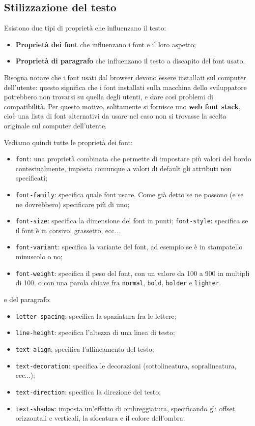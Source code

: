 \documentclass[a4paper,11pt]{article}
\begin{document}
\subsection{Stilizzazione del testo}
Esistono due tipi di proprietà che influenzano il testo:
\begin{itemize}
	\item \textbf{Proprietà dei font} che influenzano i font e il loro aspetto;
	\item \textbf{Proprietà di paragrafo} che influenzano il testo a discapito del font usato.
\end{itemize}

Bisogna notare che i font usati dal browser devono essere installati sul computer dell'utente: questo significa che i font installati sulla macchina dello sviluppatore potrebbero non trovarsi su quella degli utenti, e dare così problemi di compatibilità.
Per questo motivo, solitamente si fornisce uno \textbf{web font stack}, cioè una lista di font alternativi da usare nel caso non si trovasse la scelta originale sul computer dell'utente.

Vediamo quindi tutte le proprietà dei font:
\begin{itemize}
	\item \lstinline|font|: una proprietà combinata che permette di impostare più valori del bordo contestualmente, imposta comunque a valori di default gli attributi non specificati;
	\item \lstinline|font-family|: specifica quale font usare. Come già detto se ne possono (e se ne dovrebbero) specificare più di uno;
	\item \lstinline|font-size|: specifica la dimensione del font in punti;
		\lstinline|font-style|: specifica se il font è in corsivo, grassetto, ecc...
	\item \lstinline|font-variant|: specifica la variante del font, ad esempio se è in stampatello minuscolo o no;
	\item \lstinline|font-weight|: specifica il peso del font, con un valore da 100 a 900 in multipli di 100, o con una parola chiave fra \lstinline|normal|, \lstinline|bold|, \lstinline|bolder| e \lstinline|lighter|.
\end{itemize}
e del paragrafo:
\begin{itemize}
	\item \lstinline|letter-spacing|: specifica la spaziatura fra le lettere;
	\item \lstinline|line-height|: specifica l'altezza di una linea di testo;
	\item \lstinline|text-align|: specifica l'allineamento del testo;
	\item \lstinline|text-decoration|: specifica le decorazioni (sottolineatura, sopralineatura, ecc...);
	\item \lstinline|text-direction|: specifica la direzione del testo;
	\item \lstinline|text-shadow|: imposta un'effetto di ombreggiatura, specificando gli offset orizzontali e verticali, la sfocatura e il colore dell'ombra.
\end{itemize}
\end{document}
